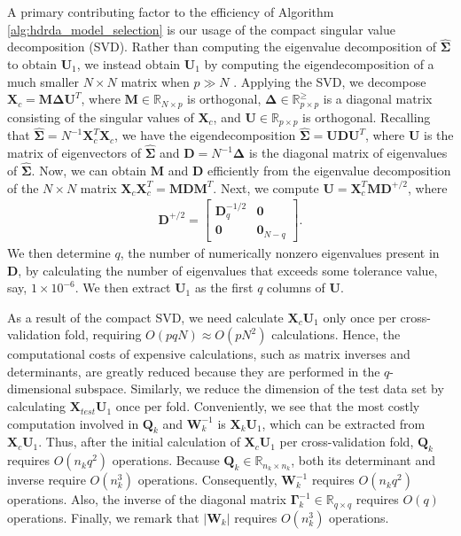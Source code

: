 \documentclass[]{interact}\usepackage[]{graphicx}\usepackage[]{color}
\begin{document}
A primary contributing factor to the efficiency of Algorithm
\ref{alg:hdrda_model_selection} is our usage of the compact singular value
decomposition (SVD). Rather than computing the eigenvalue decomposition of
$\widehat{\bm \Sigma}$ to obtain $\bm U_1$, we instead obtain $\bm U_1$ by
computing the eigendecomposition of a much smaller $N \times N$ matrix when $p
\gg N$ \cite[Chapter~18.3.5]{Hastie:2008dt}. Applying the SVD, we decompose $\bm
X_c = \bm M \bm \Delta \bm U^{T}$, where $\bm M \in \mathbb{R}_{N \times p}$ is
orthogonal, $\bm \Delta \in \mathbb{R}_{p \times p}^{\ge}$ is a diagonal matrix
consisting of the singular values of $\bm X_c$, and $\bm U \in \mathbb{R}_{p
  \times p}$ is orthogonal. Recalling that $\widehat{\bm \Sigma} = N^{-1} \bm
X_c^{T} \bm X_c$, we have the eigendecomposition $\widehat{\bm \Sigma} = \bm U
\bm D \bm U^{T}$, where $\bm U$ is the matrix of eigenvectors of $\widehat{\bm
  \Sigma}$ and $\bm D = N^{-1} \bm \Delta$ is the diagonal matrix of eigenvalues
of $\widehat{\bm \Sigma}$. Now, we can obtain $\bm M$ and $\bm D$ efficiently
from the eigenvalue decomposition of the $N \times N$ matrix $\bm X_c \bm
X_c^{T} = \bm M \bm D \bm M^{T}$. Next, we compute $\bm U = \bm X_c^{T} \bm M
\bm D^{+/2}$, where
\begin{align*}
  \bm D^{+/2} = \begin{bmatrix}
    \bm D_q^{-1/2} & \bm 0 \\
    \bm 0 & \bm 0_{N-q}
  \end{bmatrix}.
\end{align*}
We then determine $q$, the number of numerically nonzero eigenvalues present in
$\bm D$, by calculating the number of eigenvalues that exceeds some tolerance
value, say, $1 \times 10^{-6}$. We then extract $\bm U_1$ as the first $q$
columns of $\bm U$.

As a result of the compact SVD, we need calculate $\bm X_c \bm U_1$ only once
per cross-validation fold, requiring $O(p q N) \approx O(p N^2)$ calculations.
Hence, the computational costs of expensive calculations, such as matrix
inverses and determinants, are greatly reduced because they are performed in the
$q$-dimensional subspace. Similarly, we reduce the dimension of the test data
set by calculating $\bm X_{test} \bm U_1$ once per fold. Conveniently, we see
that the most costly computation involved in $\bm Q_k$ and $\bm W_k^{-1}$ is
$\bm X_k \bm U_1$, which can be extracted from $\bm X_c \bm U_1$. Thus, after
the initial calculation of $\bm X_c \bm U_1$ per cross-validation fold, $\bm
Q_k$ requires $O(n_k q^2)$ operations. Because $\bm Q_k \in \mathbb{R}_{n_k
  \times n_k}$, both its determinant and inverse require $O(n_k^3)$
operations. Consequently, $\bm W_k^{-1}$ requires $O(n_k q^2)$ operations. Also,
the inverse of the diagonal matrix $\bm \Gamma_k^{-1} \in \mathbb{R}_{q \times
  q}$ requires $O(q)$ operations. Finally, we remark that $| \bm W_k |$ requires
$O(n_k^3)$ operations.
\end{document}
